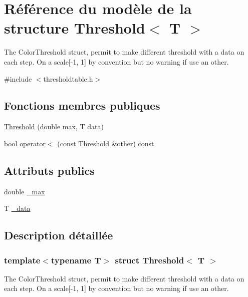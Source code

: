 \hypertarget{struct_threshold}{}\section{Référence du modèle de la structure Threshold$<$ T $>$}
\label{struct_threshold}


The Color\+Threshold struct, permit to make different threshold with a data on each step. On a scale\mbox{[}-\/1, 1\mbox{]} by convention but no warning if use an other.  




{\ttfamily \#include $<$thresholdtable.\+h$>$}

\subsection*{Fonctions membres publiques}
\begin{DoxyCompactItemize}
\item 
\hyperlink{struct_threshold_acff40589799e19c56704bf23fa25cdf5}{Threshold} (double max, T data)
\item 
bool \hyperlink{struct_threshold_a40250fbaa1d32ec4992aa7bc32480f00}{operator$<$} (const \hyperlink{struct_threshold}{Threshold} \&other) const
\end{DoxyCompactItemize}
\subsection*{Attributs publics}
\begin{DoxyCompactItemize}
\item 
double \hyperlink{struct_threshold_a45ccfaf161df097939ca2014d990c41f}{\+\_\+max}
\item 
T \hyperlink{struct_threshold_ac2020d28bcb091ebfa9a6e967cc652a3}{\+\_\+data}
\end{DoxyCompactItemize}


\subsection{Description détaillée}
\subsubsection*{template$<$typename T$>$\newline
struct Threshold$<$ T $>$}

The Color\+Threshold struct, permit to make different threshold with a data on each step. On a scale\mbox{[}-\/1, 1\mbox{]} by convention but no warning if use an other. 

